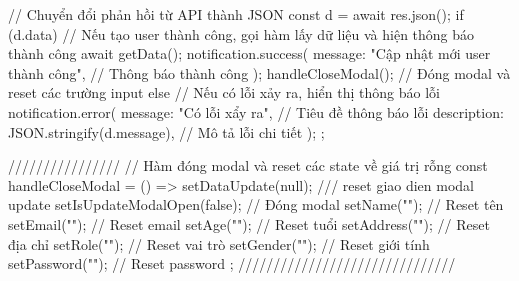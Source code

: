{{    // Chuyển đổi phản hồi từ API thành JSON
    const d = await res.json();
    if (d.data) {
      // Nếu tạo user thành công, gọi hàm lấy dữ liệu và hiện thông báo thành công
      await getData();
      notification.success({
        message: "Cập nhật mới user thành công", // Thông báo thành công
      });
      handleCloseModal(); // Đóng modal và reset các trường input
    } else {
      // Nếu có lỗi xảy ra, hiển thị thông báo lỗi
      notification.error({
        message: "Có lỗi xẩy ra", // Tiêu đề thông báo lỗi
        description: JSON.stringify(d.message), // Mô tả lỗi chi tiết
      });
    }
  };

  ////////////////
  // Hàm đóng modal và reset các state về giá trị rỗng
  const handleCloseModal = () => {
    setDataUpdate(null); /// reset giao dien modal update
    setIsUpdateModalOpen(false); // Đóng modal
    setName(""); // Reset tên
    setEmail(""); // Reset email
    setAge(""); // Reset tuổi
    setAddress(""); // Reset địa chỉ
    setRole(""); // Reset vai trò
    setGender(""); // Reset giới tính
    setPassword(""); // Reset password
  };
  ///////////////////////////////

}
